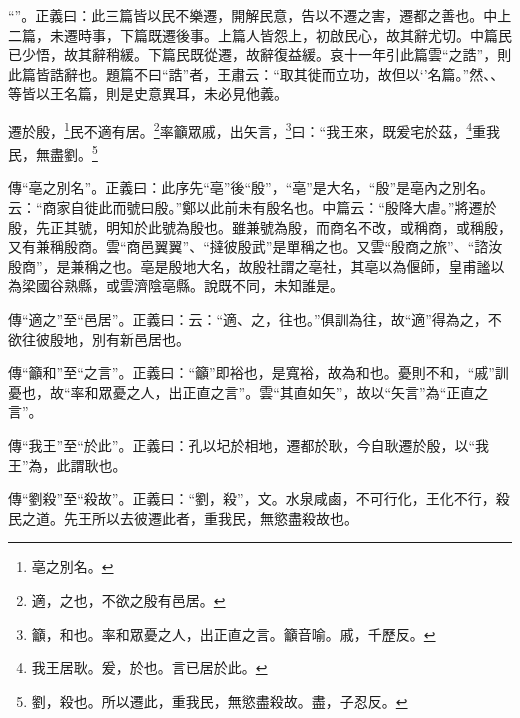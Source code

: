 {\noindent\shu{}\fzkt “”。正義曰：此三篇皆以民不樂遷，開解民意，告以不遷之害，遷都之善也。中上二篇，未遷時事，下篇既遷後事。上篇人皆怨上，初啟民心，故其辭尤切。中篇民已少悟，故其辭稍緩。下篇民既從遷，故辭復益緩。哀十一年引此篇雲“之誥”，則此篇皆誥辭也。題篇不曰“誥”者，王肅云：“取其徙而立功，故但以‘’名篇。”然、、等皆以王名篇，則是史意異耳，未必見他義。 \par}

遷於殷，\footnote{亳之別名。}民不適有居。\footnote{適，之也，不欲之殷有邑居。}率籲眾戚，出矢言，\footnote{籲，和也。率和眾憂之人，出正直之言。籲音喻。戚，千歷反。}曰：“我王來，既爰宅於茲，\footnote{我王居耿。爰，於也。言已居於此。}重我民，無盡劉。\footnote{劉，殺也。所以遷此，重我民，無慾盡殺故。盡，子忍反。}



{\noindent\zhuan{}\fzbyks 傳“亳之別名”。正義曰：此序先“亳”後“殷”，“亳”是大名，“殷”是亳內之別名。云：“商家自徙此而號曰殷。”鄭以此前未有殷名也。中篇云：“殷降大虐。”將遷於殷，先正其號，明知於此號為殷也。雖兼號為殷，而商名不改，或稱商，或稱殷，又有兼稱殷商。雲“商邑翼翼”、“撻彼殷武”是單稱之也。又雲“殷商之旅”、“諮汝殷商”，是兼稱之也。亳是殷地大名，故殷社謂之亳社，其亳以為偃師，皇甫謐以為梁國谷熟縣，或雲濟陰亳縣。說既不同，未知誰是。 \par}

{\noindent\zhuan{}\fzbyks 傳“適之”至“邑居”。正義曰：云：“適、之，往也。”俱訓為往，故“適”得為之，不欲往彼殷地，別有新邑居也。 \par}

{\noindent\zhuan{}\fzbyks 傳“籲和”至“之言”。正義曰：“籲”即裕也，是寬裕，故為和也。憂則不和，“戚”訓憂也，故“率和眾憂之人，出正直之言”。雲“其直如矢”，故以“矢言”為“正直之言”。 \par}

{\noindent\zhuan{}\fzbyks 傳“我王”至“於此”。正義曰：孔以圮於相地，遷都於耿，今自耿遷於殷，以“我王”為，此謂耿也。 \par}

{\noindent\zhuan{}\fzbyks 傳“劉殺”至“殺故”。正義曰：“劉，殺”，文。水泉咸鹵，不可行化，王化不行，殺民之道。先王所以去彼遷此者，重我民，無慾盡殺故也。 \par}

